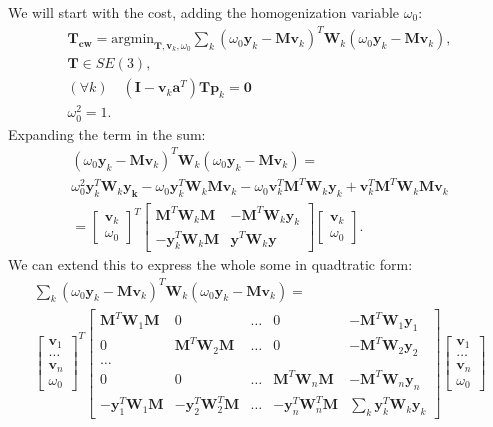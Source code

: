 \documentclass{article}
\newcommand{\mbf}[1]{\mathbf{#1}}
\begin{document}
We will start with the cost, adding the homogenization variable $\omega_0$:
\begin{align}
\mbf{T_{cw}} = \text{argmin}_{\mbf{T}, \mbf{v}_k, \omega_0} \sum_k (\omega_0\mbf{y}_k - \mbf{M} \mbf{v}_k)^T \mbf{W}_k (\omega_0 \mbf{y}_k - \mbf{M} \mbf{v}_k),\\
\mbf{T} \in SE(3),\\
(\forall k) \quad (\mbf{I} - \mbf{v}_k \mbf{a}^T)\mbf{T}\mbf{p}_k = \mbf{0}\\
\omega_0^2 = 1.
\end{align}
Expanding the term in the sum:
\begin{align}
(\omega_0\mbf{y}_k - \mbf{M} \mbf{v}_k)^T \mbf{W}_k (\omega_0 \mbf{y}_k - \mbf{M} \mbf{v}_k) = \\
\omega_0^2 \mbf{y}_k^T \mbf{W}_k \mbf{y_k} - \omega_0\mbf{y}_k^T \mbf{W}_k \mbf{M} \mbf{v}_k - \omega_0  \mbf{v}_k^T\mbf{M}^T\mbf{W}_k \mbf{y}_k + \mbf{v}_k^T\mbf{M}^T\mbf{W}_k \mbf{M} \mbf{v}_k\\
=
\begin{bmatrix} 
    \mbf{v}_k \\
    \omega_0
\end{bmatrix}^T
\begin{bmatrix}
    \mbf{M}^T\mbf{W}_k \mbf{M}     & -\mbf{M}^T \mbf{W}_k \mbf{y}_k \\
    -\mbf{y}_k^T \mbf{W}_k \mbf{M} & \mbf{y}^T \mbf{W}_k \mbf{y}
\end{bmatrix}
\begin{bmatrix}
    \mbf{v}_k \\
    \omega_0
\end{bmatrix}.
\end{align}
We can extend this to express the whole some in quadtratic form:
\begin{align}
\sum_k (\omega_0\mbf{y}_k - \mbf{M} \mbf{v}_k)^T \mbf{W}_k (\omega_0 \mbf{y}_k - \mbf{M} \mbf{v}_k) = \\
\begin{bmatrix}
    \mbf{v}_1 \\
    \dots \\
    \mbf{v}_n \\
    \omega_0
\end{bmatrix}^T
\begin{bmatrix}
    \mbf{M}^T\mbf{W}_1 \mbf{M} & 0 & \dots & 0 & -\mbf{M}^T\mbf{W}_1\mbf{y}_1 \\
    0 & \mbf{M}^T \mbf{W}_2 \mbf{M} & \dots & 0 & -\mbf{M}^T\mbf{W}_2\mbf{y}_2 \\
    \dots \\
    0 & 0 & \dots & \mbf{M}^T \mbf{W}_n \mbf{M} & -\mbf{M}^T \mbf{W}_n \mbf{y}_n \\
    -\mbf{y}_1^T \mbf{W}_1 \mbf{M} & -\mbf{y}_2^T \mbf{W}_2^T \mbf{M} & \dots & -\mbf{y}_n^T \mbf{W}_n^T \mbf{M} & \sum_k \mbf{y}_k^T \mbf{W}_k \mbf{y}_k
\end{bmatrix}
\begin{bmatrix}
    \mbf{v}_1 \\
    \dots \\
    \mbf{v}_n \\
    \omega_0
\end{bmatrix}
\end{align}
\end{document}
